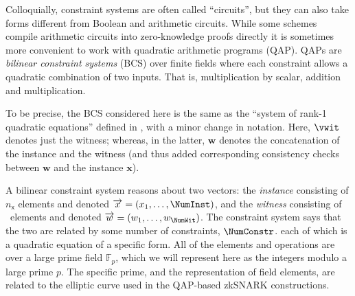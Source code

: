 Colloquially, constraint systems are often called ``circuits'', but they can also take forms different from Boolean and arithmetic circuits.
While some schemes compile arithmetic circuits into zero-knowledge proofs directly \cite{1998:crypto:zkps-for-finite-field-arithmetic} it is sometimes more convenient to work with quadratic arithmetic programs (QAP).  QAPs are \emph{bilinear constraint systems} (BCS) over finite fields where each constraint allows a quadratic combination of two inputs.
That is, multiplication by scalar, addition and multiplication.

To be precise, the BCS considered here is the same as the ``system of rank-1 quadratic equations'' defined in \cite[Appendix~E]{2013:BCGTV:crypto:SNARKs-for-C}, with a minor change in notation. 
Here, $\vwit$ denotes just the witness; whereas, in the latter, $\mathbf{w}$ denotes the concatenation of the instance and the witness (and thus added corresponding consistency checks between $\mathbf{w}$ and the instance $\mathbf{x}$). 



A bilinear constraint system reasons about two vectors: 
the \emph{instance} consisting of $n_{\mathsf{x}}$ elements and denoted $\overrightarrow{x}=(x_1,\ldots,\NumInst)$, 
and the \emph{witness} consisting of \NumWit\ elements and denoted $\overrightarrow{w}=(w_1,\ldots,w_{\NumWit})$. 
The constraint system says that the two are related by some number of constraints, $\NumConstr$.
each of which is a quadratic equation of a specific form. All of the elements and operations are over a large prime field $\mathbb{F}_p$, which we will represent here as the integers modulo a large prime $p$.
The specific prime, and the representation of field elements, are related to the elliptic curve used in the QAP-based zkSNARK constructions.


